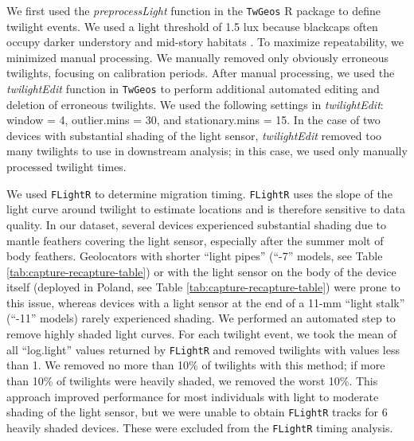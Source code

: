 \documentclass[a4paper, twoside]{templates/ociamthesis}
\begin{document}
We first used the \emph{preprocessLight} function in the \texttt{TwGeos} \autocite{wotherspoonTwGeosBasicData2016} R package to define twilight events. We used a light threshold of 1.5 lux because blackcaps often occupy darker understory and mid-story habitats \autocite{rakhimberdievComparingInferencesSolar2016}. To maximize repeatability, we minimized manual processing. We manually removed only obviously erroneous twilights, focusing on calibration periods. After manual processing, we used the \emph{twilightEdit} function in \texttt{TwGeos} to perform additional automated editing and deletion of erroneous twilights. We used the following settings in \emph{twilightEdit}: window = 4, outlier.mins = 30, and stationary.mins = 15. In the case of two devices with substantial shading of the light sensor, \emph{twilightEdit} removed too many twilights to use in downstream analysis; in this case, we used only manually processed twilight times.

We used \texttt{FLightR} \autocite{rakhimberdievFLightRPackageReconstructing2017,rakhimberdievHiddenMarkovModel2015} to determine migration timing. \texttt{FLightR} uses the slope of the light curve around twilight to estimate locations and is therefore sensitive to data quality. In our dataset, several devices experienced substantial shading due to mantle feathers covering the light sensor, especially after the summer molt of body feathers. Geolocators with shorter ``light pipes'' (``-7'' models, see Table \ref{tab:capture-recapture-table}) or with the light sensor on the body of the device itself (deployed in Poland, see Table \ref{tab:capture-recapture-table}) were prone to this issue, whereas devices with a light sensor at the end of a 11-mm ``light stalk'' (``-11'' models) rarely experienced shading. We performed an automated step to remove highly shaded light curves. For each twilight event, we took the mean of all ``log.light'' values returned by \texttt{FLightR} and removed twilights with values less than 1. We removed no more than 10\% of twilights with this method; if more than 10\% of twilights were heavily shaded, we removed the worst 10\%. This approach improved performance for most individuals with light to moderate shading of the light sensor, but we were unable to obtain \texttt{FLightR} tracks for 6 heavily shaded devices. These were excluded from the \texttt{FLightR} timing analysis.
\end{document}
